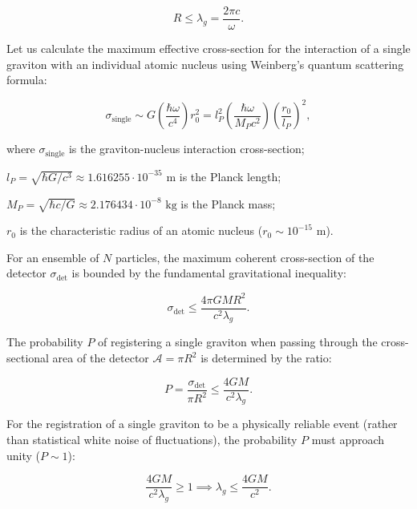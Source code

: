 \documentclass[11pt,a4paper]{article}
\theoremstyle{definition}
\begin{document}
\begin{equation}\label{eq:1.19}\tag{1.19}
R \le \lambda_g = \frac{2\pi c}{\omega}.
\end{equation}

Let us calculate the maximum effective cross-section for the interaction of a single graviton with an individual atomic nucleus using Weinberg's quantum scattering formula:

\begin{equation}\label{eq:1.20}\tag{1.20}
\sigma_{\text{single}} \sim G \left( \frac{\hbar \omega}{c^4} \right) r_0^2 = l_P^2 \left( \frac{\hbar\omega}{M_P c^2} \right) \left( \frac{r_0}{l_P} \right)^2,
\end{equation}

where $\sigma_{\text{single}}$ is the graviton-nucleus interaction cross-section;  

$l_P = \sqrt{\hbar G / c^3} \approx 1.616255 \cdot 10^{-35}\text{ m}$ is the Planck length;  

$M_P = \sqrt{\hbar c / G} \approx 2.176434 \cdot 10^{-8}\text{ kg}$ is the Planck mass;  

$r_0$ is the characteristic radius of an atomic nucleus ($r_0 \sim 10^{-15}\text{ m}$).

For an ensemble of $N$ particles, the maximum coherent cross-section of the detector $\sigma_{\text{det}}$ is bounded by the fundamental gravitational inequality:

\begin{equation}\label{eq:1.21}\tag{1.21}
\sigma_{\text{det}} \le \frac{4\pi G M R^2}{c^2 \lambda_g}.
\end{equation}

The probability $P$ of registering a single graviton when passing through the cross-sectional area of the detector $\mathcal{A} = \pi R^2$ is determined by the ratio:

\begin{equation}\label{eq:1.22}\tag{1.22}
P = \frac{\sigma_{\text{det}}}{\pi R^2} \le \frac{4 G M}{c^2 \lambda_g}.
\end{equation}

For the registration of a single graviton to be a physically reliable event (rather than statistical white noise of fluctuations), the probability $P$ must approach unity ($P \sim 1$):

\begin{equation}\label{eq:1.23}\tag{1.23}
\frac{4 G M}{c^2 \lambda_g} \ge 1 \implies \lambda_g \le \frac{4 G M}{c^2}.
\end{equation}
\end{document}
